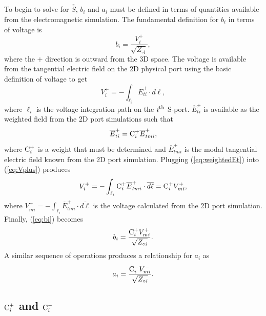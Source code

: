\documentclass[titlepage]{article}
\renewcommand\_{\textunderscore\linebreak[1]}
\begin{document}
To begin to solve for $\overline{\overline{S}}$, $b_i$  and $a_i$ must be defined in terms of quantities available from the electromagnetic simulation.  The fundamental definition for $b_i$ in terms of voltage is
\begin{equation}
\label{eq:bi}
b_i=\frac{V_{i}^{+}}{\sqrt{Z_{\circ i}}},
\end{equation}
where the $+$ direction is outward from the 3D space.  The voltage is available from the tangential electric field on the 2D physical port using the basic definition of voltage to get
\begin{equation}
\label{eq:Vplus}
V_{i}^{+}=-\int_{\ell_i} \overline{E}_{ti}^{+}\cdot \overline{d\ell},
\end{equation}
where $\ell_i$ is the voltage integration path on the $i^{\textnormal{th}}$ S-port.  $\overline{E}_{ti}^{+}$ is available as the weighted field from the 2D port simulations such that 
\begin{equation}
\label{eq:weightedEt}
\overline{E}_{ti}^{+}=\textnormal{C}_{i}^{+}\overline{E}_{tmi}^{+},
\end{equation}
where $\textnormal{C}_{i}^{+}$ is a weight that must be determined and $\overline{E}_{tmi}^{+}$ is the modal tangential electric field known from the 2D port simulation. Plugging (\ref{eq:weightedEt}) into (\ref{eq:Vplus}) produces
\begin{equation}
V_{i}^{+}=-\int_{\ell_i} \textnormal{C}_{i}^{+}\overline{E}_{tmi}^{+}\cdot \overline{d\ell}=\textnormal{C}_{i}^{+}V_{mi}^{+},
\end{equation}
where $V_{mi}^{+}=-\int_{\ell_i}\overline{E}_{tmi}^{+}\cdot \overline{d\ell}$ is the voltage calculated from the 2D port simulation.  Finally, (\ref{eq:bi}) becomes
\begin{equation}
\label{eq:bifinal}
b_i=\frac{\textnormal{C}_{i}^{+}V_{mi}^{+}}{\sqrt{Z_{\circ i}}}.
\end{equation}
A similar sequence of operations produces a relationship for $a_i$ as
\begin{equation}
\label{eq:aifinal}
a_i=\frac{\textnormal{C}_{i}^{-}V_{mi}^{-}}{\sqrt{Z_{\circ i}}}.  
\end{equation}

\subsection{$\textnormal{C}_{i}^{+}$ and $\textnormal{C}_{i}^{-}$}
\label{sec:C}
\end{document}
